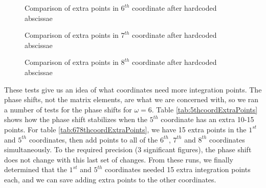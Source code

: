 \documentclass[Dissertation.tex]{subfiles}
\begin{document}
\begin{figure}[H]
\centering
{}
\caption{Comparison of extra points in $6^{th}$ coordinate after hardcoded abscissae}
\label{fig:PlusCoord6}
\end{figure}

\begin{figure}[H]
\centering
{}
\caption{Comparison of extra points in $7^{th}$ coordinate after hardcoded abscissae}
\label{fig:PlusCoord7}
\end{figure}

\begin{figure}[H]
\centering
{}
\caption{Comparison of extra points in $8^{th}$ coordinate after hardcoded abscissae}
\label{fig:PlusCoord8}
\end{figure}

These tests give us an idea of what coordinates need more integration points. The phase shifts, not the matrix elements, are what we are concerned with, so we ran a number of tests for the phase shifts for $\omega = 6$. Table \ref{tab:5thcoordExtraPoints} shows how the phase shift stabilizes when the $5^{th}$ coordinate has an extra 10-15 points. For table \ref{tab:678thcoordExtraPoints}, we have 15 extra points in the $1^{st}$ and $5^{th}$ coordinates, then add points to all of the $6^{th}$, $7^{th}$ and $8^{th}$ coordinates simultaneously. To the required precision (3 significant figures), the phase shift does not change with this last set of changes. From these runs, we finally determined that the $1^{st}$ and $5^{th}$ coordinates needed 15 extra integration points each, and we can save adding extra points to the other coordinates.
\end{document}
